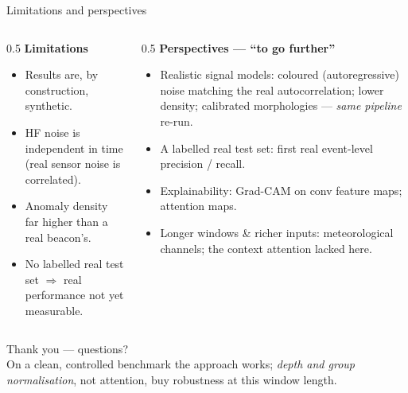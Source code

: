 \documentclass[11pt, aspectratio=169]{beamer}
\begin{document}
\begin{frame}{Limitations and perspectives}
  \begin{columns}[T]
    \begin{column}{0.5\linewidth}
      \textbf{Limitations}
      \begin{itemize}\footnotesize
        \item Results are, by construction, \alert{synthetic}.
        \item HF noise is independent in time (real sensor noise is correlated).
        \item Anomaly density far higher than a real beacon's.
        \item No labelled real test set $\Rightarrow$ real performance not yet
              measurable.
      \end{itemize}
    \end{column}
    \begin{column}{0.5\linewidth}
      \textbf{Perspectives --- ``to go further''}
      \begin{itemize}\footnotesize
        \item \alert{Realistic signal models}: coloured (autoregressive) noise
              matching the real autocorrelation; lower density; calibrated
              morphologies --- \emph{same pipeline} re-run.
        \item \alert{A labelled real test set}: first real event-level precision
              / recall.
        \item \alert{Explainability}: Grad-CAM on conv feature maps; attention
              maps.
        \item \alert{Longer windows \& richer inputs}: meteorological channels;
              the context attention lacked here.
      \end{itemize}
    \end{column}
  \end{columns}
\end{frame}

\begin{frame}[standout]
  Thank you --- questions?
  \vspace{0.6em}\\
  {\normalsize\normalfont On a clean, controlled benchmark the approach works;
   \emph{depth and group normalisation}, not attention, buy robustness at this
   window length.}
\end{frame}
\end{document}
